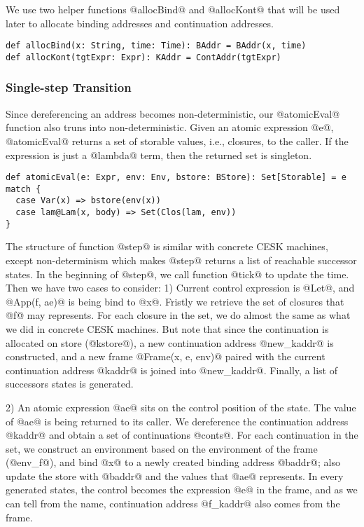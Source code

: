 \documentclass[acmsmall,review,anonymous]{acmart}\settopmatter{printfolios=true,printccs=false,printacmref=false}
\begin{document}
We use two helper functions @allocBind@ and @allocKont@ that will be used later
to allocate binding addresses and continuation addresses.

\begin{lstlisting}
def allocBind(x: String, time: Time): BAddr = BAddr(x, time)
def allocKont(tgtExpr: Expr): KAddr = ContAddr(tgtExpr)
\end{lstlisting}

\subsubsection{Single-step Transition}

Since dereferencing an address becomes non-deterministic, our @atomicEval@
function also truns into non-deterministic. Given an atomic expression @e@,
@atomicEval@ returns a set of storable values, i.e., closures, to the caller.
If the expression is just a @lambda@ term, then the returned set is singleton.

\begin{lstlisting}
def atomicEval(e: Expr, env: Env, bstore: BStore): Set[Storable] = e match {
  case Var(x) => bstore(env(x))
  case lam@Lam(x, body) => Set(Clos(lam, env))
}
\end{lstlisting}

The structure of function @step@ is similar with concrete CESK machines, 
except non-determinism which makes @step@ returns a list of reachable 
successor states.
In the beginning of @step@, we call function @tick@ to update 
the time.
Then we have two cases to consider: 1) Current control expression is @Let@,
and @App(f, ae)@ is being bind to @x@.
Fristly we retrieve the set of closures that @f@ may represents.
For each closure in the set, we do almost the same as what we did in concrete 
CESK machines. But note that since the continuation is allocated on store (@kstore@),
a new continuation address @new_kaddr@ is constructed, and a new frame
@Frame(x, e, env)@ paired with the current continuation address @kaddr@
is joined into @new_kaddr@. Finally, a list of successors states is generated.

2) An atomic expression @ae@ sits on the control position of the state.
The value of @ae@ is being returned to its caller. 
We dereference the continuation address @kaddr@ and obtain a set of
continuations @conts@.
For each continuation in the set, we construct an environment based on the
environment of the frame (@env_f@), and bind @x@ to a newly created binding 
address @baddr@; also update the store with @baddr@ and 
the values that @ae@ represents. In every generated states,
the control becomes the expression @e@ in the frame,
and as we can tell from the name, continuation address @f_kaddr@
also comes from the frame.
\end{document}

